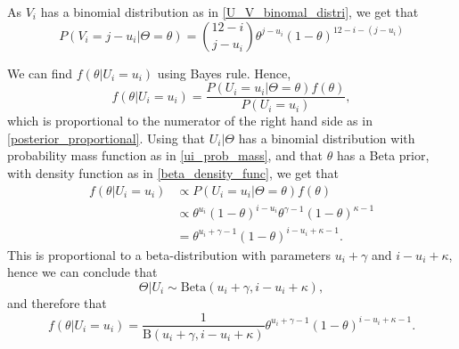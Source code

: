As $V_i$ has a binomial distribution as in \eqref{U_V_binomal_distri}, we get that
\begin{equation*}
    P(V_i=j-u_i|\Theta=\theta)=\binom{12-i}{j-u_i}\theta^{j-u_i}(1-\theta)^{12-i-(j-u_i)}
\end{equation*}


We can find $f(\theta| U_i=u_i)$ using Bayes rule. Hence,
\begin{equation*}
    f(\theta| U_i=u_i) = \frac{P(U_i=u_i|\Theta=\theta)f(\theta)}{P(U_i=u_i)},
\end{equation*}
which is proportional to the numerator of the right hand side as in \eqref{posterior_proportional}. Using that $U_i|\Theta$ has a binomial distribution with probability mass function as in \eqref{ui_prob_mass}, and that $\theta$ has a Beta prior, with density function as in \eqref{beta_density_func}, we get that
\begin{equation*}
    \begin{aligned}
        f(\theta|U_i=u_i) 
        &\propto P(U_i=u_i|\Theta=\theta)f(\theta)\\[6pt] 
        &\propto \theta^{u_i}(1-\theta)^{i-u_i}\theta^{\gamma-1}(1-\theta)^{\kappa-1}\\[6pt]
        &= \theta^{u_i+\gamma-1}(1-\theta)^{i-u_i+\kappa-1}.
    \end{aligned}
\end{equation*}
This is proportional to a beta-distribution with parameters $u_i+\gamma$ and $i-u_i+\kappa$, hence we can conclude that
\begin{equation*}
    \Theta|U_i \sim \text{Beta}(u_i+\gamma,i-u_i+\kappa),
\end{equation*}
and therefore that 
\begin{equation}
\label{theta_given_ui}
    f(\theta|U_i=u_i) = \frac{1}{\text{B}(u_i+\gamma,i-u_i+\kappa)}\theta^{u_i+\gamma-1}(1-\theta)^{i-u_i+\kappa-1}.
\end{equation}

